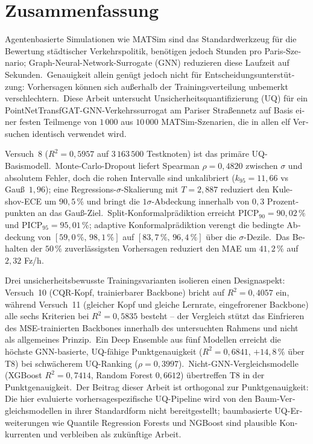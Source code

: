 \chapter*{Zusammenfassung}

\begin{otherlanguage}{ngerman}
Agentenbasierte Simulationen wie MATSim sind das Standardwerkzeug f\"ur die Bewertung st\"adtischer Verkehrspolitik, ben\"otigen jedoch Stunden pro Paris-Szenario; Graph-Neural-Network-Surrogate (GNN) reduzieren diese Laufzeit auf Sekunden.\ Genauigkeit allein gen\"ugt jedoch nicht f\"ur Entscheidungsunterst\"utzung: Vorhersagen k\"onnen sich au\ss{}erhalb der Trainingsverteilung unbemerkt verschlechtern.\ Diese Arbeit untersucht Unsicherheitsquantifizierung (UQ) f\"ur ein PointNetTransfGAT-GNN-Verkehrssurrogat am Pariser Stra\ss{}ennetz auf Basis einer festen Teilmenge von $1\,000$ aus $10\,000$ MATSim-Szenarien, die in allen elf Versuchen identisch verwendet wird.

Versuch~8 ($R^2 = 0{,}5957$ auf $3\,163\,500$ Testknoten) ist das prim\"are UQ-Basismodell.\ Monte-Carlo-Dropout liefert Spearman $\rho = 0{,}4820$ zwischen $\sigma$ und absolutem Fehler, doch die rohen Intervalle sind unkalibriert ($k_{95} = 11{,}66$ vs Gau\ss\ $1{,}96$); eine Regressions-$\sigma$-Skalierung mit $T = 2{,}887$ reduziert den Kuleshov-ECE um $90{,}5\,\%$ und bringt die $1\sigma$-Abdeckung innerhalb von $0{,}3$ Prozentpunkten an das Gau\ss-Ziel.\ Split-Konformalpr\"adiktion erreicht $\mathrm{PICP}_{90} = 90{,}02\,\%$ und $\mathrm{PICP}_{95} = 95{,}01\,\%$; adaptive Konformalpr\"adiktion verengt die bedingte Abdeckung von $[59{,}0\,\%,\,98{,}1\,\%]$ auf $[83{,}7\,\%,\,96{,}4\,\%]$ \"uber die $\sigma$-Dezile.\ Das Behalten der $50\,\%$ zuverl\"assigsten Vorhersagen reduziert den MAE um $41{,}2\,\%$ auf $2{,}32$ Fz/h.

Drei unsicherheitsbewusste Trainingsvarianten isolieren einen Designaspekt: Versuch~10 (CQR-Kopf, trainierbarer Backbone) bricht auf $R^2 = 0{,}4057$ ein, w\"ahrend Versuch~11 (gleicher Kopf und gleiche Lernrate, eingefrorener Backbone) alle sechs Kriterien bei $R^2 = 0{,}5835$ besteht -- der Vergleich st\"utzt das Einfrieren des MSE-trainierten Backbones innerhalb des untersuchten Rahmens und nicht als allgemeines Prinzip.\ Ein Deep Ensemble aus f\"unf Modellen erreicht die h\"ochste GNN-basierte, UQ-f\"ahige Punktgenauigkeit ($R^2 = 0{,}6841$, $+14{,}8\,\%$ \"uber T8) bei schw\"acherem UQ-Ranking ($\rho = 0{,}3997$).\ Nicht-GNN-Vergleichsmodelle (XGBoost $R^2 = 0{,}7414$, Random Forest $0{,}6612$) \"ubertreffen T8 in der Punktgenauigkeit.\ Der Beitrag dieser Arbeit ist orthogonal zur Punktgenauigkeit: Die hier evaluierte vorhersagespezifische UQ-Pipeline wird von den Baum-Vergleichsmodellen in ihrer Standardform nicht bereitgestellt; baumbasierte UQ-Erweiterungen wie Quantile Regression Forests und NGBoost sind plausible Konkurrenten und verbleiben als zuk\"unftige Arbeit.
\end{otherlanguage}
